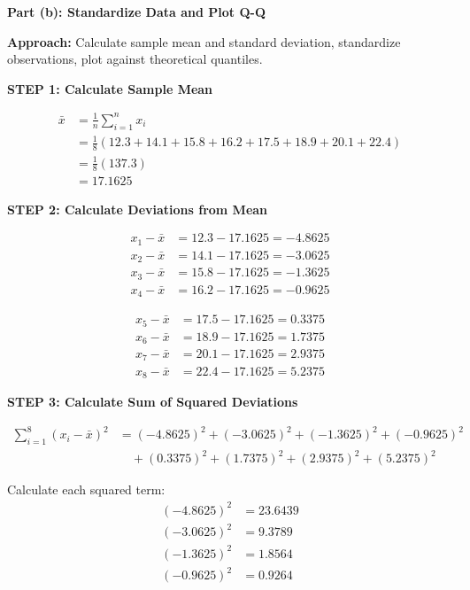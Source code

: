 \documentclass[12pt]{article}
\begin{document}
\begin{solution}

\textbf{Part (b): Standardize Data and Plot Q-Q}

\textbf{Approach:} Calculate sample mean and standard deviation, standardize observations, plot against theoretical quantiles.

\textbf{STEP 1: Calculate Sample Mean}

\begin{align*}
\bar{x} &= \frac{1}{n}\sum_{i=1}^{n} x_i \\
&= \frac{1}{8}(12.3 + 14.1 + 15.8 + 16.2 + 17.5 + 18.9 + 20.1 + 22.4) \\
&= \frac{1}{8}(137.3) \\
&= 17.1625
\end{align*}

\textbf{STEP 2: Calculate Deviations from Mean}

\begin{align*}
x_1 - \bar{x} &= 12.3 - 17.1625 = -4.8625 \\
x_2 - \bar{x} &= 14.1 - 17.1625 = -3.0625 \\
x_3 - \bar{x} &= 15.8 - 17.1625 = -1.3625 \\
x_4 - \bar{x} &= 16.2 - 17.1625 = -0.9625
\end{align*}

\begin{align*}
x_5 - \bar{x} &= 17.5 - 17.1625 = 0.3375 \\
x_6 - \bar{x} &= 18.9 - 17.1625 = 1.7375 \\
x_7 - \bar{x} &= 20.1 - 17.1625 = 2.9375 \\
x_8 - \bar{x} &= 22.4 - 17.1625 = 5.2375
\end{align*}

\textbf{STEP 3: Calculate Sum of Squared Deviations}

\begin{align*}
\sum_{i=1}^{8} (x_i - \bar{x})^2 &= (-4.8625)^2 + (-3.0625)^2 + (-1.3625)^2 + (-0.9625)^2 \\
&\quad + (0.3375)^2 + (1.7375)^2 + (2.9375)^2 + (5.2375)^2
\end{align*}

Calculate each squared term:
\begin{align*}
(-4.8625)^2 &= 23.6439 \\
(-3.0625)^2 &= 9.3789 \\
(-1.3625)^2 &= 1.8564 \\
(-0.9625)^2 &= 0.9264
\end{align*}


\end{solution}
\end{document}
